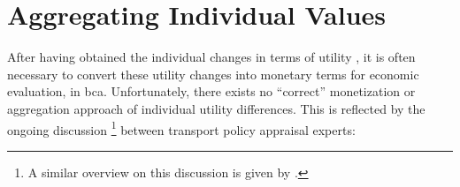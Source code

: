 \section{Aggregating Individual Values}
\label{ch:economicEval:aggregatingValues}
After having obtained the individual changes in terms of utility%
%
%
, it is often necessary to convert these utility changes into monetary terms for economic evaluation, \eg in \gls{bca}.
%
Unfortunately, there exists no ``correct'' monetization or aggregation approach of individual utility differences. This is reflected by the ongoing discussion%
%
\footnote{
%
A similar overview on this discussion is given by 
\citet{BoerjessonEliasson2014SwedishVTTS}.
%
}
%
between transport policy appraisal experts:
%
